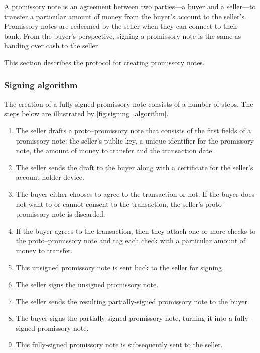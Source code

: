\documentclass[12pt,a4paper]{article}
\begin{document}
\begin{multicols}{2}
	A promissory note is an agreement between two parties---a buyer and a seller---to transfer a particular amount of money from the buyer's account to the seller's. Promissory notes are redeemed by the seller when they can connect to their bank. From the buyer's perspective, signing a promissory note is the same as handing over cash to the seller. 
	
	This section describes the protocol for creating promissory notes.

	\subsubsection{Signing algorithm}
	
	The creation of a fully signed promissory note consists of a number of steps. The steps below are illustrated by \autoref{fig:signing_algorithm}.
	
	\begin{enumerate}
		\item The seller drafts a proto--promissory note that consists of the first fields of a promissory note: the seller's public key, a unique identifier for the promissory note, the amount of money to transfer and the transaction date.
		
		\item The seller sends the draft to the buyer along with a certificate for the seller's account holder device.
		
		\item The buyer either chooses to agree to the transaction or not. If the buyer does not want to or cannot consent to the transaction, the seller's proto--promissory note is discarded.
		
		\item If the buyer agrees to the transaction, then they attach one or more checks to the proto--promissory note and tag each check with a particular amount of money to transfer. 
		
		\item This unsigned promissory note is sent back to the seller for signing.
		
		\item The seller signs the unsigned promissory note.
		
		\item The seller sends the resulting partially-signed promissory note to the buyer.
		
		\item The buyer signs the partially-signed promissory note, turning it into a fully-signed promissory note.
		
		\item This fully-signed promissory note is subsequently sent to the seller.
	\end{enumerate}

	\end{multicols}
	\newpage
	
\end{document}

